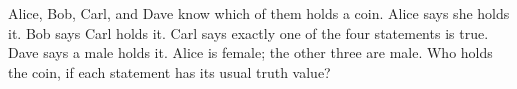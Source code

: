 Alice, Bob, Carl, and Dave know which of them holds a coin. Alice says she holds it. Bob says Carl holds it. Carl says exactly one of the four statements is true. Dave says a male holds it. Alice is female; the other three are male. Who holds the coin, if each statement has its usual truth value?
